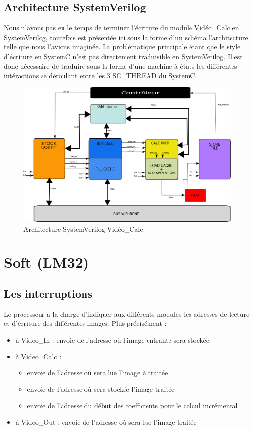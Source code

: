 \documentclass[a4paper,12pt]{report}
\begin{document}
{{	 \section{Architecture SystemVerilog}
	 Nous n'avons pas eu le temps de terminer l'écriture du module Vidéo\_Calc en SystemVerilog, toutefois est présentée ici sous la forme d'un schéma l'architecture telle que nous l'avions imaginée. La problématique principale étant que le style d'écriture en SystemC n'est pas directement traduisible en SystemVerilog. Il est donc nécessaire de traduire sous la forme d'une machine à états les différentes intéractions se déroulant entre les 3 SC\_THREAD du SystemC.

		\begin{figure}[!h]
		\centering
		\includegraphics[scale = 0.15]{video_calc_verilog.png}
	 \caption{Architecture SystemVerilog Vidéo\_Calc}
	 \end{figure}

	 \chapter{Soft (LM32)}

	 \section{Les interruptions}

	 {Le processeur a la charge d'indiquer aux différents modules les adresses de lecture et d'écriture des différentes images. Plus précisément :

		\begin{itemize}
		\item à Video\_In : envoie de l'adresse où l'image entrante sera stockée
		  \item à Video\_Calc : \begin{itemize}
		\item envoie de l'adresse où sera lue l'image à traitée
		  \item envoie de l'adresse où sera stockée l'image traitée
		  \item envoie de l'adresse du début des coefficients pour le calcul incrémental
		  \end{itemize}
		\item à Video\_Out : envoie de l'adresse où sera lue l'image traitée
		  \end{itemize}

}}}
\end{document}
